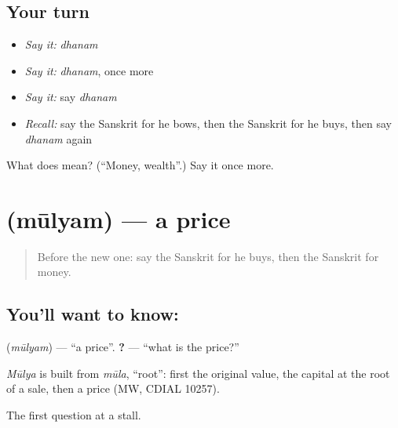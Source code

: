 \subsection*{Your turn}
\begin{itemize}
\raggedright
  \item \emph{Say it:} \emph{dhanam}
  \item \emph{Say it:} \emph{dhanam}, once more
  \item \emph{Say it:} say \emph{dhanam}
  \item \emph{Recall:} say the Sanskrit for he bows, then the Sanskrit for he buys, then say \emph{dhanam} again
\end{itemize}

\begin{tcolorbox}[breakable,colback=teal!4,colframe=teal!35!black,title={Before you move on}]
What does  mean? (\textquotedblleft{}Money, wealth\textquotedblright{}.) Say it once more.
\end{tcolorbox}
\section[\texorpdfstring{\sk{मूल्यम्} (mūlyam)}{मूल्यम् (mūlyam)}]{ (mūlyam) — a price}

\label{lesson:SA-C74-price}



\begin{quote}
Before the new one: say the Sanskrit for he buys, then the Sanskrit for money.
\end{quote}

\subsection*{You'll want to know: }
\textbf{} (\emph{mūlyam}) — \textquotedblleft{}a price\textquotedblright{}. \textbf{ ?} — \textquotedblleft{}what is the price?\textquotedblright{}

\begin{cousinweb}
\emph{Mūlya} is built from \emph{mūla}, \textquotedblleft{}root\textquotedblright{}: first the original value, the capital at the root of a sale, then a price (MW, CDIAL 10257).
\end{cousinweb}

\begin{grammarlens}[title={What you've built}]
The first question at a stall.
\end{grammarlens}


